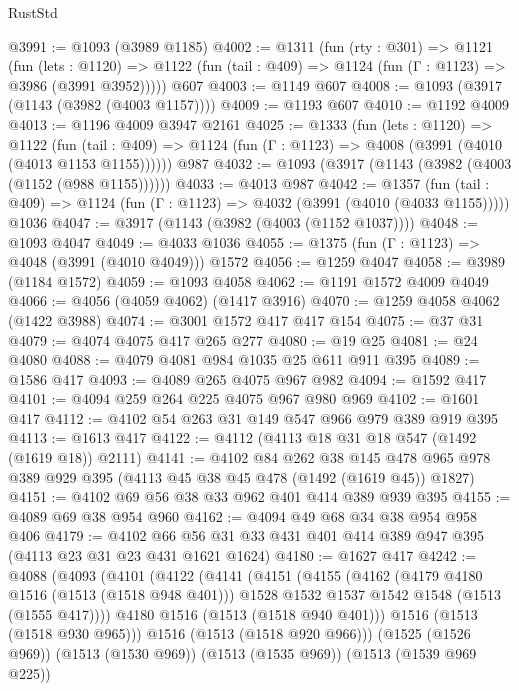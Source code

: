 \begin{lexlean}{RustStd}
\begin{coremodule}
{\begin{coremodule}
{{{{{{{{@3991 := @1093 (@3989 @1185)
@4002 := @1311
    (fun (rty : @301) =>
    @1121
      (fun (lets : @1120) =>
      @1122 (fun (tail : @409) => @1124 (fun (Γ : @1123) => @3986 (@3991 @3952)))))
    @607
@4003 := @1149 @607
@4008 := @1093 (@3917 (@1143 (@3982 (@4003 @1157))))
@4009 := @1193 @607
@4010 := @1192 @4009
@4013 := @1196 @4009 @3947 @2161
@4025 := @1333
    (fun (lets : @1120) =>
    @1122
      (fun (tail : @409) => @1124 (fun (Γ : @1123) => @4008 (@3991 (@4010 (@4013 @1153 @1155))))))
    @987
@4032 := @1093 (@3917 (@1143 (@3982 (@4003 (@1152 (@988 @1155))))))
@4033 := @4013 @987
@4042 := @1357
    (fun (tail : @409) => @1124 (fun (Γ : @1123) => @4032 (@3991 (@4010 (@4033 @1155)))))
    @1036
@4047 := @3917 (@1143 (@3982 (@4003 (@1152 @1037))))
@4048 := @1093 @4047
@4049 := @4033 @1036
@4055 := @1375 (fun (Γ : @1123) => @4048 (@3991 (@4010 @4049))) @1572
@4056 := @1259 @4047
@4058 := @3989 (@1184 @1572)
@4059 := @1093 @4058
@4062 := @1191 @1572 @4009 @4049
@4066 := @4056 (@4059 @4062) (@1417 @3916)
@4070 := @1259 @4058 @4062 (@1422 @3988)
@4074 := @3001 @1572 @417 @417 @154
@4075 := @37 @31
@4079 := @4074 @4075 @417 @265 @277
@4080 := @19 @25
@4081 := @24 @4080
@4088 := @4079 @4081 @984 @1035 @25 @611 @911 @395
@4089 := @1586 @417
@4093 := @4089 @265 @4075 @967 @982
@4094 := @1592 @417
@4101 := @4094 @259 @264 @225 @4075 @967 @980 @969
@4102 := @1601 @417
@4112 := @4102 @54 @263 @31 @149 @547 @966 @979 @389 @919 @395
@4113 := @1613 @417
@4122 := @4112 (@4113 @18 @31 @18 @547 (@1492 (@1619 @18)) @2111)
@4141 := @4102
    @84
    @262
    @38
    @145
    @478
    @965
    @978
    @389
    @929
    @395
    (@4113 @45 @38 @45 @478 (@1492 (@1619 @45)) @1827)
@4151 := @4102 @69 @56 @38 @33 @962 @401 @414 @389 @939 @395
@4155 := @4089 @69 @38 @954 @960
@4162 := @4094 @49 @68 @34 @38 @954 @958 @406
@4179 := @4102 @66 @56 @31 @33 @431 @401 @414 @389 @947 @395 (@4113 @23 @31 @23 @431 @1621 @1624)
@4180 := @1627 @417
@4242 := @4088
    (@4093
      (@4101
        (@4122
          (@4141
            (@4151
              (@4155
                (@4162
                  (@4179 @4180 @1516 (@1513 (@1518 @948 @401)))
                  @1528
                  @1532
                  @1537
                  @1542
                  @1548
                  (@1513 (@1555 @417))))
              @4180
              @1516
              (@1513 (@1518 @940 @401)))
            @1516
            (@1513 (@1518 @930 @965)))
          @1516
          (@1513 (@1518 @920 @966)))
        (@1525 (@1526 @969))
        (@1513 (@1530 @969))
        (@1513 (@1535 @969))
        (@1513 (@1539 @969 @225))
}}}}}}}}
\end{coremodule}}
\end{coremodule}
\end{lexlean}
